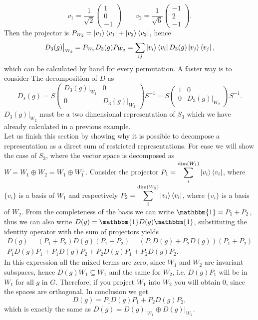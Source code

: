 \documentclass[12pt]{book}
\theoremstyle{plain}
\newcommand{\I}{\mathbbm{1}}
\theoremstyle{definition}
\theoremstyle{remark}
\begin{document}
\[v_1 = \frac{1}{\sqrt{2}}\begin{pmatrix}1\\0\\-1\end{pmatrix}\qquad v_2 = \frac{1}{\sqrt{6}}\begin{pmatrix}-1\\2\\-1\end{pmatrix}.\]
Then the projector is $P_{W_2} = \ket{v_1}\bra{v_1} + \ket{v_2}\bra{v_2}$, hence
\[D_3(g)\big|_{W_2} = P_{W_2}D_3(g)P_{W_2} = \sum_{ij} \ket{v_i}\bra{v_i}D_3(g)\ket{v_j}\bra{v_j},\]
which can be calculated by hand for every permutation. A faster way is to consider The decomposition of $D$ as
\[D_s(g) = S \begin{pmatrix}D_3(g)\big|_{W_1}&0\\0& D_3(g)\big|_{W_2} \end{pmatrix}S^{-1} =S \begin{pmatrix}1&0\\0& D_3(g)\big|_{W_2} \end{pmatrix}S^{-1}.\]
$D_3(g)\big|_{W_2} $ must be a two dimensional representation of $S_3$ which we have already calculated in a previous example.\\
Let us finish this section by showing why it is possible to decompose a representation as a direct sum of restricted representations. For ease we will show the case of $S_3$, where the vector space is decomposed as $W =W_1\oplus W_2 = W_1 \oplus W_1^\perp$. Consider the projector $P_1 = \displaystyle\sum_i ^{\text{dim}(W_1)}\ket{v_i}\bra{v_i}$, where $\{v_i\}$ is a basis of $W_1$ and respectively $P_2 = \displaystyle\sum_i ^{\text{dim}(W_2)}\ket{v_i}\bra{v_i}$, where $\{v_i\}$ is a basis of $W_2$. From the completeness of the basis we can write $\I = P_1 + P_2$, thus we can also write $D(g) = \I D(g) \I$, substituting the identity operator with the sum of projectors yields
\begin{multline}
D(g) = (P
_1 + P_2)D(g)(P_1 + P_2) = (P_1D(g) + P_2D(g))(P_1 + P_2)\\ P_1D(g)P_1 +P_1D(g)P_2+P_2D(g)P_1+P_2D(g)P_2.
\end{multline}
In this expression all the mixed terms are zero, since $W_1$ and $W_2$ are invariant subspaces, hence $D(g)W_1 \subseteq W_1$ and the same for $W_2$, i.e. $D(g)P_1$ will be in $W_1$ for all $g$ in $G$. Therefore, if you project $W_1$ into $W_2$ you will obtain 0, since the spaces are orthogonal. In conclusion we get
\[D(g) =P_1D(g)P_1 + P_2D(g)P_2,\]
which is exactly the same as $D(g) = D(g)\big|_{W_1} \oplus  D(g)\big|_{W_2}$.
\end{document}
